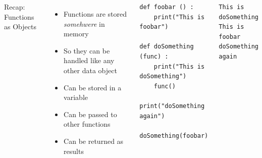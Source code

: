 
\begin{frame}[fragile]
%
\begin{columns}[T]
\begin{Large}
	{Recap: Functions as Objects}
	\vspace{12pt}
\end{Large}
\begin{itemize}
\item Functions are stored \emph{somehwere} in memory
\item So they can be handled like any other data object
\item Can be stored in a variable
\item Can be passed to other functions
\item Can be returned as results
\end{itemize}
%
\begin{codebox}
\begin{verbatim}
def foobar () :
    print("This is foobar")

def doSomething (func) :
    print("This is doSomething")
    func()
    print("doSomething again")

doSomething(foobar)
\end{verbatim}
\end{codebox}
%
\begin{cmdbox}
\begin{verbatim}
This is doSomething
This is foobar
doSomething again
\end{verbatim}
\end{cmdbox}
\end{columns}
%
\end{frame}


